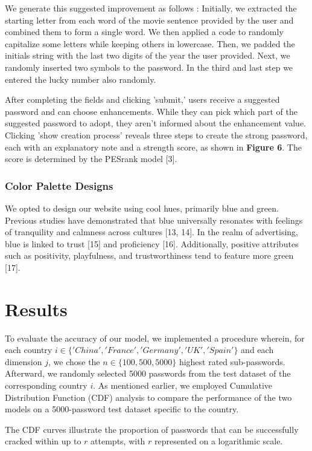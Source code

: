 \documentclass[5p,twocolumn]{elsarticle}
\begin{document}
We generate this suggested improvement as follows : Initially, we extracted the starting letter from each word of the movie sentence provided by the user and combined them to form a single word. We then applied a code to randomly capitalize some letters while keeping others in lowercase. Then, we padded the initials string with the last two digits of the year the user provided. Next, we randomly inserted two symbols to the password. In the third and last step we entered the lucky number also randomly.

After completing the fields and clicking 'submit,' users receive a suggested password and can choose enhancements. While they can pick which part of the suggested password to adopt, they aren't informed about the enhancement value. Clicking 'show creation process' reveals three steps to create the strong password, each with an explanatory note and a strength score, as shown in \textbf{Figure 6}. The score is determined by the PESrank model [3].

\subsubsection{\textbf{Color Palette Designs}}
We opted to design our website using cool hues, primarily blue and green. Previous studies have demonstrated that blue universally resonates with feelings of tranquility and calmness across cultures [13, 14]. In the realm of advertising, blue is linked to trust [15] and proficiency [16]. Additionally, positive attributes such as positivity, playfulness, and trustworthiness tend to feature more green [17].

\section{Results}
To evaluate the accuracy of our model, we implemented a procedure wherein, for each country \(i\in\{{'China', 'France', 'Germany', 'UK', 'Spain'}\}\) and each dimension \(j\), we chose the \(n\in\{100, 500, 5000\}\) highest rated sub-passwords. Afterward, we randomly selected 5000 passwords from the test dataset of the corresponding country \( i\). As mentioned earlier, we employed Cumulative Distribution Function (CDF) analysis to compare the performance of the two models on a 5000-password test dataset specific to the country. 

The CDF curves illustrate the proportion of passwords that can be successfully cracked within up to \( r\) attempts, with \(r\) represented on a logarithmic scale.
\end{document}
